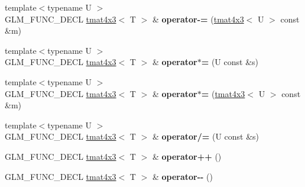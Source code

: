 \begin{DoxyCompactItemize}
\item 
\hypertarget{structglm_1_1detail_1_1tmat4x3_a1ca0ea38b179936389e27ca5c9daaa7f}{{\footnotesize template$<$typename U $>$ }\\\-G\-L\-M\-\_\-\-F\-U\-N\-C\-\_\-\-D\-E\-C\-L \hyperlink{structglm_1_1detail_1_1tmat4x3}{tmat4x3}$<$ \-T $>$ \& {\bfseries operator-\/=} (\hyperlink{structglm_1_1detail_1_1tmat4x3}{tmat4x3}$<$ \-U $>$ const \&m)}\label{structglm_1_1detail_1_1tmat4x3_a1ca0ea38b179936389e27ca5c9daaa7f}

\item 
\hypertarget{structglm_1_1detail_1_1tmat4x3_ae1e4ff8a46162ac71f6bcac84198c84e}{{\footnotesize template$<$typename U $>$ }\\\-G\-L\-M\-\_\-\-F\-U\-N\-C\-\_\-\-D\-E\-C\-L \hyperlink{structglm_1_1detail_1_1tmat4x3}{tmat4x3}$<$ \-T $>$ \& {\bfseries operator$\ast$=} (\-U const \&s)}\label{structglm_1_1detail_1_1tmat4x3_ae1e4ff8a46162ac71f6bcac84198c84e}

\item 
\hypertarget{structglm_1_1detail_1_1tmat4x3_ac713866116b423e932a359dac48ddde2}{{\footnotesize template$<$typename U $>$ }\\\-G\-L\-M\-\_\-\-F\-U\-N\-C\-\_\-\-D\-E\-C\-L \hyperlink{structglm_1_1detail_1_1tmat4x3}{tmat4x3}$<$ \-T $>$ \& {\bfseries operator$\ast$=} (\hyperlink{structglm_1_1detail_1_1tmat4x3}{tmat4x3}$<$ \-U $>$ const \&m)}\label{structglm_1_1detail_1_1tmat4x3_ac713866116b423e932a359dac48ddde2}

\item 
\hypertarget{structglm_1_1detail_1_1tmat4x3_a913d9f5c18287ad6bccd028e7ceddb46}{{\footnotesize template$<$typename U $>$ }\\\-G\-L\-M\-\_\-\-F\-U\-N\-C\-\_\-\-D\-E\-C\-L \hyperlink{structglm_1_1detail_1_1tmat4x3}{tmat4x3}$<$ \-T $>$ \& {\bfseries operator/=} (\-U const \&s)}\label{structglm_1_1detail_1_1tmat4x3_a913d9f5c18287ad6bccd028e7ceddb46}

\item 
\hypertarget{structglm_1_1detail_1_1tmat4x3_a38ac70839201809f248c35b5cc5d8756}{\-G\-L\-M\-\_\-\-F\-U\-N\-C\-\_\-\-D\-E\-C\-L \hyperlink{structglm_1_1detail_1_1tmat4x3}{tmat4x3}$<$ \-T $>$ \& {\bfseries operator++} ()}\label{structglm_1_1detail_1_1tmat4x3_a38ac70839201809f248c35b5cc5d8756}

\item 
\hypertarget{structglm_1_1detail_1_1tmat4x3_a2cae7d9072aad10e4a383b9cffebfa89}{\-G\-L\-M\-\_\-\-F\-U\-N\-C\-\_\-\-D\-E\-C\-L \hyperlink{structglm_1_1detail_1_1tmat4x3}{tmat4x3}$<$ \-T $>$ \& {\bfseries operator-\/-\/} ()}\label{structglm_1_1detail_1_1tmat4x3_a2cae7d9072aad10e4a383b9cffebfa89}

\end{DoxyCompactItemize}
